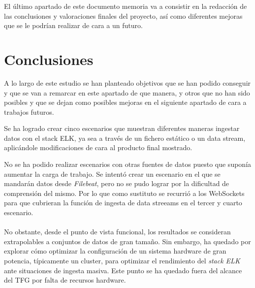 
El último apartado de este documento memoria va a consistir en la redacción de las conclusiones y valoraciones finales del proyecto, así como diferentes mejoras que se le podrían realizar de cara a un futuro.

\section{Conclusiones}

A lo largo de este estudio se han planteado objetivos que se han podido conseguir y que se van a remarcar en este apartado de que manera, y otros que no han sido posibles y que se dejan como posibles mejoras en el siguiente apartado de cara a trabajos futuros.

Se ha logrado crear cinco escenarios que muestran diferentes maneras ingestar datos con el stack ELK, ya sea a través de un fichero estático o un data stream, aplicándole modificaciones de cara al producto final mostrado.

No se ha podido realizar escenarios con otras fuentes de datos puesto que suponía aumentar la carga de trabajo. Se intentó crear un escenario en el que se mandarán datos desde \textit{Filebeat}, pero no se pudo lograr por la dificultad de comprensión del mismo. Por lo que como sustituto se recurrió a los WebSockets para que cubrieran la función de ingesta de data streeams en el tercer y cuarto escenario. 

\paragraph{}
\paragraph{}
\paragraph{}

No obstante, desde el punto de vista funcional, los resultados se consideran extrapolables a conjuntos de datos de gran tamaño. Sin embargo, ha quedado por explorar cómo optimizar la configuración de un sistema hardware de gran potencia, típicamente un cluster, para optimizar el rendimiento del \textit{stack ELK} ante situaciones de ingesta masiva. Este punto se ha quedado fuera del alcance del TFG por falta de recursos hardware. 


